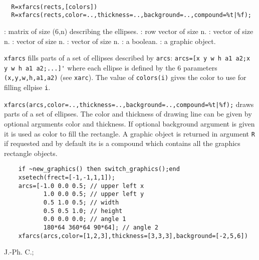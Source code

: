 
\begin{mandesc}
  \\ %
\end{mandesc}
\begin{calling_sequence}
\begin{verbatim}
  R=xfarcs(rects,[colors])
  R=xfarcs(rects,color=..,thickness=..,background=..,compound=%t|%f);
\end{verbatim}
\end{calling_sequence}

\begin{parameters}
  \begin{varlist}
    : matrix of size (6,n) describing the ellipses.
    : row vector of size n.
    : vector of size n.
    : vector of size n.
    : vector of size n.
    : a boolean.
    : a graphic object.
  \end{varlist}
\end{parameters}

\begin{mandescription}
  \verb!xfarcs! fills parts of a set of ellipses described by \verb!arcs!: 
  \verb!arcs=[x y w h a1 a2;x y w h a1 a2;...]'! where each ellipse is defined 
  by the 6 parameters \verb!(x,y,w,h,a1,a2)! (see \verb!xarc!).
  The value of \verb!colors(i)! gives the color to use for filling ellpise \verb!i!.

  \verb!xfarcs(arcs,color=..,thickness=..,background=..,compound=%t|%f);! 
  draws parts of a set of ellipses. The color and thickness of drawing line can be given by optional arguments
  color and thickness. If optional background argument is given it is used as color to fill
  the rectangle. A graphic object is returned in argument \verb!R! if requested and by default
  its is a compound which contains all the graphics rectangle objects.
\end{mandescription}

\begin{examples}
  \begin{Verbatim}
    if ~new_graphics() then switch_graphics();end
    xsetech(frect=[-1,-1,1,1]);
    arcs=[-1.0 0.0 0.5; // upper left x
           1.0 0.0 0.5; // upper left y
           0.5 1.0 0.5; // width
           0.5 0.5 1.0; // height
           0.0 0.0 0.0; // angle 1
           180*64 360*64 90*64]; // angle 2
    xfarcs(arcs,color=[1,2,3],thickness=[3,3,3],background=[-2,5,6])
  \end{Verbatim}
\end{examples}

\begin{manseealso}
     
\end{manseealso}


\begin{authors}
  J.-Ph. C.;   
\end{authors}

